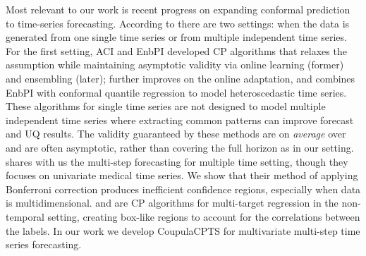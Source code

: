 Most relevant to our work is recent progress on expanding conformal prediction to time-series forecasting. According to \cite{Schaar2021conformaltime} there are two settings: when the data is generated from one single time series or from multiple independent time series. For the first setting, ACI \cite{gibbs2021adaptive} and EnbPI \cite{xu2021conformal} developed CP algorithms that relaxes the  assumption while maintaining asymptotic validity via online learning (former) and ensembling (later); \cite{zaffran2022adaptive} further improves on the online adaptation, and \cite{sousa2022general} combines EnbPI with conformal quantile regression  to model heteroscedastic time series. These algorithms for single time series are not designed to model multiple independent time series where extracting common patterns can improve forecast and UQ results. The validity guaranteed by these methods are on \textit{average} over  and are often asymptotic, rather than covering the full horizon as in our setting.  
\cite{Schaar2021conformaltime} shares with us the multi-step forecasting for multiple time  setting, though they focuses on univariate medical time series. We show that their method of applying Bonferroni correction produces inefficient confidence regions, especially when data is multidimensional. \cite{neeven2018weather} and \cite{messoudi2020multitarget} are CP algorithms for multi-target regression in the non-temporal setting, creating box-like regions to account for the correlations between the labels. In our work we develop CoupulaCPTS for multivariate multi-step time series forecasting.

